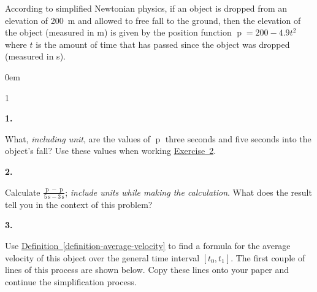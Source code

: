 \documentclass[12pt,]{book}
\theoremstyle{plain}
\theoremstyle{definition}
\numberwithin{equation}{section}
\newcounter{figstack}
\newlength\fight
\newcommand\pushValignCaptionBottom[5][b]{%
\stepcounter{figstack}%
\expandafter\def\csname %
figalign\romannumeral\value{figstack}\endcsname{#1}%
\expandafter\def\csname %
figtype\romannumeral\value{figstack}\endcsname{#2}%
\expandafter\def\csname %
figwd\romannumeral\value{figstack}\endcsname{#3}%
\expandafter\def\csname %
figcontent\romannumeral\value{figstack}\endcsname{#4}%
\expandafter\def\csname %
figcap\romannumeral\value{figstack}\endcsname{#5}%
\setbox0=\hbox{%
\begin{#2}{#3}#4\end{#2}}%
\ifdim\dimexpr\ht0+\dp0\relax>\fight\global\setlength{\fight}{%
\dimexpr\ht0+\dp0\relax}\fi%
}
\newenvironment{exercisegroup}%
{\medskip\noindent}%
{\par\bigskip}%
\newlength{\exercisegroupindent}%
\newlength{\exercisegroupitemwidth}%
\newenvironment{exercisegrouplist}%
{\vspace{-\partopsep}%
\begin{adjustwidth}{\exercisegroupindent}{0em}}%
{\end{adjustwidth}%
\vspace{-\partopsep}%
\vspace{\baselineskip}}%
\newenvironment{exercisegroupbycol}[1]%
{\begin{exercisegrouplist}%
\vspace{-\multicolsep}%
\begin{multicols}{#1}%
\setlength{\parindent}{0em}%
\setlength{\exercisegroupitemwidth}{\linewidth}}%
{\end{multicols}%
\vspace{-\multicolsep}%
\end{exercisegrouplist}}%
\newenvironment{exercisegroupitem}[1]%
{\begin{minipage}[t]{\exercisegroupitemwidth}
\vspace{0pt}%
{\bfseries#1}%
\rule{0pt}{\baselineskip}}{\strut%
\end{minipage}%
\hspace{\columnsep}}%
\providecommand\phantomsection{}
\newcommand{\fe}[2]{\mathop{{#1}{\left(#2\right)}}}
\newcommand{\cinterval}[2]{\left[#1,#2\right]}
\begin{document}
\begin{exercisegroup}%
According to simplified Newtonian physics, if an object is dropped from an elevation of \SI{200}{\meter} and allowed to free fall to the ground, then the elevation of the object (measured in \si{\meter}) is given by the position function \(\fe{p}{t}=200-4.9t^2\) where \(t\) is the amount of time that has passed since the object was dropped (measured in \si{\second}).%
\par
\begin{exercisegroupbycol}{1}%
\begin{exercisegroupitem}{1. }\phantomsection\hypertarget{exercise-1}{\null}
What, \emph{including unit}, are the values of \(\fe{p}{t}\) three seconds and five seconds into the object's fall? Use these values when working \hyperref[exercise-average-velocity]{Exercise~2}.%
\end{exercisegroupitem}%
\par%
\begin{exercisegroupitem}{2. }\phantomsection\hypertarget{exercise-average-velocity}{\null}
Calculate \(\frac{\fe{p}{5\,\text{s}}-\fe{p}{3\,\text{s}}}{{5\,\text{s}}-{3\,\text{s}}}\); \emph{include units while making the calculation}. What does the result tell you in the context of this problem?%
\end{exercisegroupitem}%
\par%
\begin{exercisegroupitem}{3. }\phantomsection\hypertarget{exercise-average-velocity-formula}{\null}
Use \hyperref[definition-average-velocity]{Definition~\ref*{definition-average-velocity}} to find a formula for the average velocity of this object over the general time interval \(\cinterval{t_0}{t_1}\). The first couple of lines of this process are shown below. Copy these lines onto your paper and continue the simplification process.%
\end{exercisegroupitem}
\end{exercisegroupbycol}
\end{exercisegroup}
\end{document}
